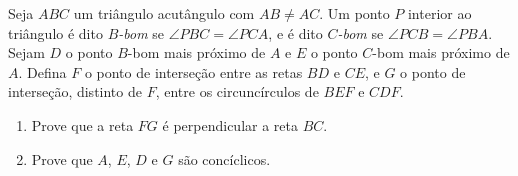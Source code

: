 Seja $ABC$ um triângulo acutângulo com $AB \neq AC$. Um ponto $P$ interior ao triângulo é dito \emph{$B$-bom} se $\angle PBC = \angle PCA$, e é dito \emph{$C$-bom} se $\angle PCB = \angle PBA$.
Sejam $D$ o ponto $B$-bom mais próximo de $A$ e $E$ o ponto $C$-bom mais próximo de $A$.
Defina $F$ o ponto de interseção entre as retas $BD$ e $CE$, e $G$ o ponto de interseção, distinto de $F$, entre os circuncírculos de $BEF$ e $CDF$.

\begin{enumerate}[label = (\alph*)]
	\item Prove que a reta $FG$ é perpendicular a reta $BC$.
	\item Prove que $A$, $E$, $D$ e $G$ são concíclicos.
\end{enumerate}
